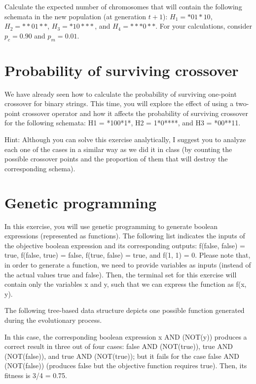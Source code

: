 \documentclass{article}
\begin{document}
Calculate the expected number of chromosomes that will contain the following schemata in the new population (at generation $t + 1$): $H_1 = *01*10$, $H_2 = **01**$, $H_3 = *10***$, and $H_4 = ***0**$. For your
calculations, consider $p_c = 0.90$ and $p_m = 0.01$.

\section{Probability of surviving crossover}
We have already seen how to calculate the probability of surviving one-point crossover for binary strings. This time, you will explore the effect of using a two-point crossover operator and how it affects the probability of surviving crossover for the following schemata: H1 = *100*1*, H2 = 1*0****, and H3 = *00**11.

Hint: Although you can solve this exercise analytically, I suggest you to analyze each one of the cases in a similar way as we did it in class (by counting the possible crossover points and the proportion of them that will destroy the corresponding schema).


\section{Genetic programming}
In this exercise, you will use genetic programming to generate boolean expressions (represented as functions). The following list indicates the inputs of the objective boolean expression and its corresponding outputs: f(false, false) = true, f(false, true) = false, f(true, false) = true, and f(1, 1) = 0. Please note that, in order to generate a function, we need to provide variables as inputs (instead of the actual values true and false). Then, the terminal set for this exercise will contain only the variables x and y, such that we can express the function as f(x, y).

The following tree-based data structure depicts one possible function generated during the evolutionary process.

In this case, the corresponding boolean expression x AND (NOT(y)) produces a correct result in three out of four cases: false AND (NOT(true)), true AND (NOT(false)), and true AND (NOT(true)); but it fails for the case false AND (NOT(false)) (produces false but the objective function requires true). Then, its fitness is 3/4 = 0.75.
\end{document}
